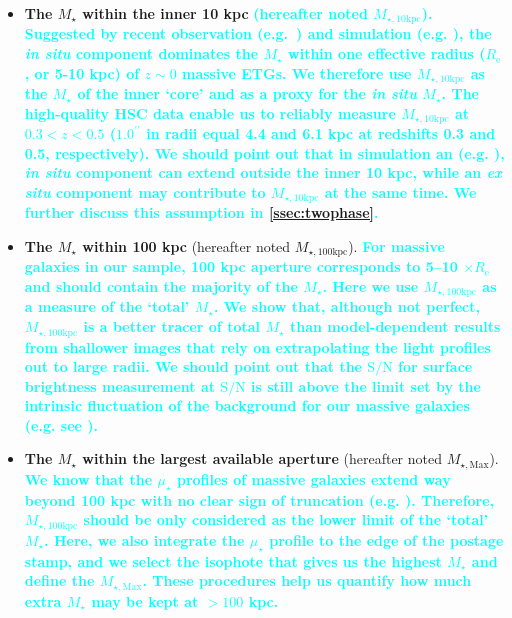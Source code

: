 \documentclass[fleqn,usenatbib]{mnras}
\def\arcsec{{\prime\prime}}
\def\mstar{{$M_{\star}$}}
\def\minn{{$M_{\star,10\mathrm{kpc}}$}}
\def\mtot{{$M_{\star,100\mathrm{kpc}}$}}
\def\mmax{{$M_{\star,\mathrm{Max}}$}}
\def\s2n{{$\mathrm{S}/\mathrm{N}$}}
\def\mden{{$\mu_{\star}$}}
\newcommand{\song}[1]{\textcolor{cyan}{\textbf{#1}}}
\begin{document}
    \begin{itemize} 
       
        \item \textbf{The \mstar{} within the inner 10 kpc} 
            \song{
            (hereafter noted \minn{}). 
            Suggested by recent observation (e.g.~\citealt{vanDokkum2010}) and 
            simulation (e.g. \citealt{RodriguezGomez2016}), the \textit{in situ} 
            component dominates the \mstar{} within one effective radius 
            ($R_{\mathrm{e}}$, or 5-10 kpc) of $z{\sim}0$ massive ETGs.
            We therefore use \minn{} as the \mstar{} of the inner `core' and as 
            a proxy for the \textit{in situ} \mstar{}. 
            The high-quality HSC data enable us to reliably measure \minn{} at 
            $0.3 < z < 0.5$ ($1.0^{\arcsec}$ in radii equal 4.4 and 6.1 kpc 
            at redshifts 0.3 and 0.5, respectively).
            We should point out that in simulation an
            (e.g. \citealt{RodriguezGomez2016}), \textit{in situ} component can 
            extend outside the inner 10 kpc, while an \textit{ex situ} component may 
            contribute to \minn{} at the same time.  
            We further discuss this assumption in \ref{ssec:twophase}.
            }
            
        \item \textbf{The \mstar{} within 100 kpc} 
            (hereafter noted \mtot{}). 
            \song{
            For massive galaxies in our sample, 100 kpc aperture corresponds to 5--10 
            $\times R_{\mathrm{e}}$ and should contain the majority of the \mstar{}. 
            Here we use \mtot{} as a measure of the `total' \mstar{}. 
            We show that, although not perfect, \mtot{} is a better tracer 
            of total \mstar{} than model-dependent results from shallower images 
            that rely on extrapolating the light profiles out to large radii. 
            We should point out that the \s2n{} for surface brightness measurement 
            at \s2n{} is still above the limit set by the intrinsic fluctuation 
            of the background for our massive galaxies 
            (e.g. see \citealt{Pohlen2006}). 
            }
            
        \item \textbf{The \mstar{} within the largest available aperture} 
            (hereafter noted \mmax{}).
            \song{
            We know that the \mden{} profiles of massive galaxies extend way beyond 
            100 kpc with no clear sign of truncation
            (e.g. \citealt{Gonzalez2005, Tal2011, DSouza2014}).
            Therefore, \mtot{} should be only considered as the lower limit of the
            `total' \mstar{}. 
            Here, we also integrate the \mden{} profile to the edge of the 
            postage stamp, and we select the isophote that gives us the highest  
            \mstar{} and define the \mmax{}. 
            These procedures help us quantify how much extra \mstar{} may be kept 
            at $>100$ kpc.
            }
            
    \end{itemize}
       
\end{document}
